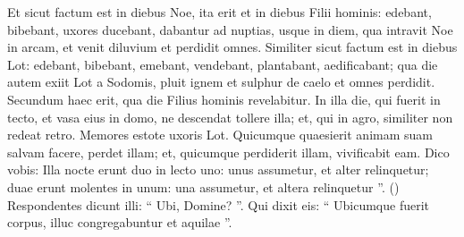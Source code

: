 \begin{biblechapter}
\begin{biblechapter}
\begin{biblechapter}
\begin{biblechapter}
\begin{biblechapter}
\begin{biblechapter}
\begin{biblechapter}
\begin{biblechapter}
\begin{biblechapter}
\begin{biblechapter}
\begin{biblechapter}
\begin{biblechapter}
\begin{biblechapter}
\begin{biblechapter}
\begin{biblechapter}
\begin{biblechapter}
\begin{biblechapter}
\verse Et sicut factum est in diebus Noe, ita erit et in diebus Filii hominis: 
\verse edebant, bibebant, uxores ducebant, dabantur ad nuptias, usque in diem, qua intravit Noe in arcam, et venit diluvium et perdidit omnes. 
\verse Similiter sicut factum est in diebus Lot: edebant, bibebant, emebant, vendebant, plantabant, aedificabant; 
 \verse qua die autem exiit Lot a Sodomis, pluit ignem et sulphur de caelo et omnes perdidit. 
\verse Secundum haec erit, qua die Filius hominis revelabitur. 
\verse In illa die, qui fuerit in tecto, et vasa eius in domo, ne descendat tollere illa; et, qui in agro, similiter non redeat retro. 
\verse Memores estote uxoris Lot. 
\verse Quicumque quaesierit animam suam salvam facere, perdet illam; et, quicumque perdiderit illam, vivificabit eam. 
\verse Dico vobis: Illa nocte erunt duo in lecto uno:
 unus assumetur, et alter relinquetur; 
\verse duae erunt molentes in unum: una assumetur, et altera relinquetur ”. 
(\verse) \verse Respondentes dicunt illi: “ Ubi, Domine? ”. Qui dixit eis: “ Ubicumque fuerit corpus, illuc congregabuntur et aquilae ”.
 

\end{biblechapter}
\end{biblechapter}
\end{biblechapter}
\end{biblechapter}
\end{biblechapter}
\end{biblechapter}
\end{biblechapter}
\end{biblechapter}
\end{biblechapter}
\end{biblechapter}
\end{biblechapter}
\end{biblechapter}
\end{biblechapter}
\end{biblechapter}
\end{biblechapter}
\end{biblechapter}
\end{biblechapter}
